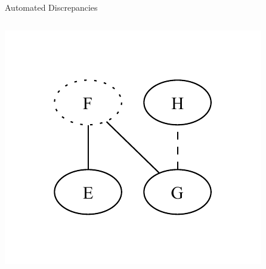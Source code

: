 \documentclass{beamer}
\begin{document}
\begin{frame}{Automated Discrepancies}
\begin{columns}[c]
\begin{column}{.4\textwidth}
            \includegraphics[width=\textwidth]{assets/graphs/SynExampleGlossaryGraph.pdf}
        \end{column}
    \end{columns} \pause
    \vspace{-0.25cm}
\end{frame}
\end{document}
